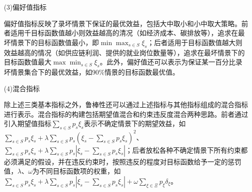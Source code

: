 (3)偏好值指标

偏好值指标反映了录坏情景下保证的最优效益，包括大中取小和小中取大策略\cite{yan2008}。前者适用千目标函数值越小则效益越高的清况（如经济成本、碳排放等），追求在最坏情景下的目标函数值最小，即$\displaystyle{\min\max_{s\in S}\xi_s}$；后者适用于目标函数值越大则效益越高的情况（如供应链利润、提供的就业岗位数量等），追求在最坏情景下的目标函数值最大$\displaystyle{\max\min_{s\in S}\xi_s}$。此外，偏好值还可以表示为保证某一百分比录坏情景集合下的最优效益，如90\%情景的目标函数最优值\cite{Giarola2012}。

(4)混合指标

除上述三类基本指标之外，鲁棒性还可以通过上述指标与其他指标组成的混合指标进行表示。混合指标的构建包括期望值混合和约束违反度混合两种思路。前者通过引入期望值指标$\displaystyle{\sum_{s\in S}p_s\xi_s}$表示不确定情景下的期望效益，如$\displaystyle{\sum_{s\in S}p_s\xi_s+\lambda\sum_{s\in S}p_s(\xi_s-\sum_{s\in S}p_s\xi_s)^2}$、$\displaystyle{\sum_{s\in S}p_s\xi_s+\lambda\sum_{s\in S}p_s|\xi_s-\sum_{s\in S}p_s\xi_s|}$\cite{Mulvey1995, Yu2000}；后者放松各种不确定情景下所有约束都必须满足的假设，并在违反约束时，按照违反的程度对目标函数给予一定的惩罚值，$\lambda$、$\omega$为不同目标函数项的权重，如$\displaystyle{\sum_{s\in S}p_s\xi_s+\lambda\sum_{s\in S}p_s|\xi_s-\sum_{s\in S}p_s\xi_s|}+\omega\sum_{\xi\in \Xi}p_\xi\delta_\xi$\cite{Jabbarzadeh2014}。
\cleardoublepage